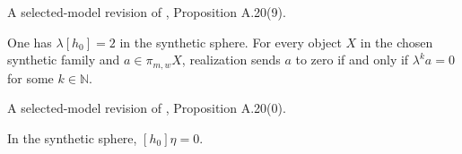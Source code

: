 \begin{theorem}
\label{frontier:Literature:e10e68418839}
A selected-model revision of \cite{BHS}, Proposition A.20(9).\par

One has $\lambda[h_0]=2$ in the synthetic sphere. For every object $X$ in the chosen synthetic family and $a\in\pi_{m,w}X$, realization sends $a$ to zero if and only if $\lambda^k a=0$ for some $k\in\mathbb N$.

A selected-model revision of \cite{BHS}, Proposition A.20(0).\par

In the synthetic sphere, $[h_0]\eta=0$.

\end{theorem}
